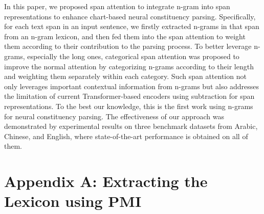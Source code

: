 \documentclass[11pt,a4paper]{article}
\begin{document}
In this paper, we proposed span attention to integrate n-gram into span representations to enhance chart-based neural constituency parsing.
Specifically, for each text span in an input sentence, we firstly extracted n-grams in that span from an n-gram lexicon, and then fed them into the span attention to weight them according to their contribution to the parsing process.
To better leverage n-grams, especially the long ones, categorical span attention was proposed to improve the normal attention by categorizing n-grams according to their length and weighting them separately within each category.
Such span attention not only leverages important contextual information from n-grams but also addresses the limitation of current Transformer-based encoders using subtraction for span representations.
To the best our knowledge, this is the first work using n-grams for neural constituency parsing.
The effectiveness of our approach was demonstrated by experimental results on three benchmark datasets from 
Arabic, Chinese, and English, where 
state-of-the-art performance is obtained on all of them.







\appendix



\vspace{1cm}

\section*{Appendix A: Extracting the Lexicon using PMI} \label{app: pmi}
\end{document}
